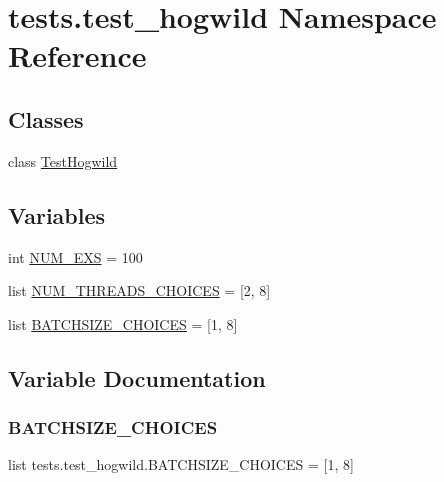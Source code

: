 \hypertarget{namespacetests_1_1test__hogwild}{}\section{tests.\+test\+\_\+hogwild Namespace Reference}
\label{namespacetests_1_1test__hogwild}
\subsection*{Classes}
\begin{DoxyCompactItemize}
\item 
class \hyperlink{classtests_1_1test__hogwild_1_1TestHogwild}{Test\+Hogwild}
\end{DoxyCompactItemize}
\subsection*{Variables}
\begin{DoxyCompactItemize}
\item 
int \hyperlink{namespacetests_1_1test__hogwild_a7d6d1b096d23ad4ee58574b9eb82f891}{N\+U\+M\+\_\+\+E\+XS} = 100
\item 
list \hyperlink{namespacetests_1_1test__hogwild_a487945cdbcdd386aa4aa417ad7c1a100}{N\+U\+M\+\_\+\+T\+H\+R\+E\+A\+D\+S\+\_\+\+C\+H\+O\+I\+C\+ES} = \mbox{[}2, 8\mbox{]}
\item 
list \hyperlink{namespacetests_1_1test__hogwild_a69c8bbe8ac724b49216e95f37eff368f}{B\+A\+T\+C\+H\+S\+I\+Z\+E\+\_\+\+C\+H\+O\+I\+C\+ES} = \mbox{[}1, 8\mbox{]}
\end{DoxyCompactItemize}


\subsection{Variable Documentation}
\mbox{\label{namespacetests_1_1test__hogwild_a69c8bbe8ac724b49216e95f37eff368f}} 
\subsubsection{\texorpdfstring{B\+A\+T\+C\+H\+S\+I\+Z\+E\+\_\+\+C\+H\+O\+I\+C\+ES}{BATCHSIZE\_CHOICES}}
{\footnotesize\ttfamily list tests.\+test\+\_\+hogwild.\+B\+A\+T\+C\+H\+S\+I\+Z\+E\+\_\+\+C\+H\+O\+I\+C\+ES = \mbox{[}1, 8\mbox{]}}



